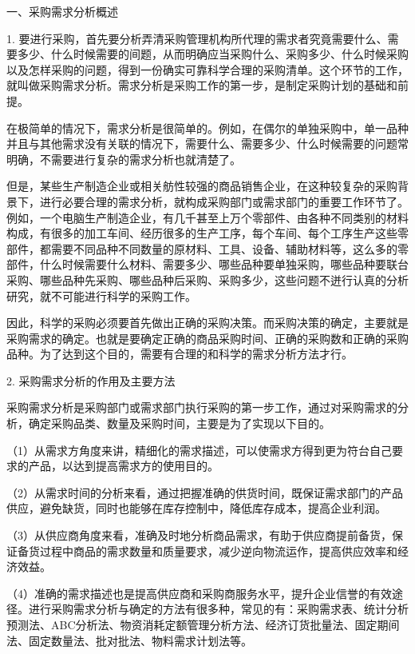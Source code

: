 一、采购需求分析概述

    1. 要进行采购，首先要分析弄清采购管理机构所代理的需求者究竟需要什么、需要多少、什么时候需要的间题，从而明确应当采购什么、采购多少、什么时候采购以及怎样采购的问题，得到一份确实可靠科学合理的采购清单。这个环节的工作，就叫做采购需求分析。需求分析是采购工作的第一步，是制定采购计划的基础和前提。

    在极简单的情况下，需求分析是很简单的。例如，在偶尔的单独采购中，单一品种并且与其他需求没有关联的情况下，需要什么、需要多少、什么时候需要的问题常明确，不需要进行复杂的需求分析也就清楚了。

    但是，某些生产制造企业或相关舫性较强的商品销售企业，在这种较复杂的采购背景下，进行必要合理的需求分析，就构成采购部门或需求部门的重要工作环节了。例如，一个电脑生产制造企业，有几千甚至上万个零部件、由各种不同类别的材料构成，有很多的加工车间、经历很多的生产工序，每个车间、每个工序生产这些零部件，都需要不同品种不同数量的原材料、工具、设备、辅助材料等，这么多的零部件，什么时候需要什么材料、需要多少、哪些品种要单独采购，哪些品种要联台采购、哪些品种先采购、哪些品种后采购、采购多少，这些问题不迸行认真的分析研究，就不可能进行科学的采购工作。

    因此，科学的采购必须要首先做出正确的采购决策。而采购决策的确定，主要就是采购需求的确定。也就是要确定正确的商品采购时间、正确的采购数和正确的采购品种。为了达到这个目的，需要有合理的和科学的需求分析方法才行。

    2. 采购需求分析的作用及主要方法

    采购需求分析是采购部门或需求部门执行采购的第一步工作，通过对采购需求的分析，确定采购品类、数量及采购时间，主要是为了实现以下目的。

    （1）从需求方角度来讲，精细化的需求描述，可以使需求方得到更为符台自己要求的产品，以达到提高需求方的使用目的。

    （2）从需求时间的分析来看，通过把握准确的供货时间，既保证需求部门的产品供应，避免缺货，同时也能够在库存控制中，降低库存成本，提高企业利润。

    （3）从供应商角度来看，准确及时地分析商品需求，有助于供应商提前备货，保证备货过程中商品的需求数量和质量要求，减少逆向物流运作，提高供应效率和经济效益。

    （4）准确的需求描述也是提高供应商和采购商服务水平，提升企业信誉的有效途径。进行采购需求分析与确定的方法有很多种，常见的有：采购需求表、统计分析预测法、ABC分析法、物资消耗定额管理分析方法、经济订货批量法、固定期间法、固定数量法、批对批法、物料需求计划法等。
